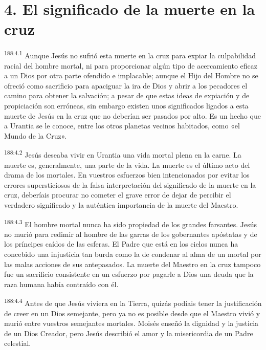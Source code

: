 \section*{4. El significado de la muerte en la cruz}
\par
\textsuperscript{188:4.1} Aunque Jesús no sufrió esta muerte en la cruz para expiar la culpabilidad racial del hombre mortal, ni para proporcionar algún tipo de acercamiento eficaz a un Dios por otra parte ofendido e implacable; aunque el Hijo del Hombre no se ofreció como sacrificio para apaciguar la ira de Dios y abrir a los pecadores el camino para obtener la salvación; a pesar de que estas ideas de expiación y de propiciación son erróneas, sin embargo existen unos significados ligados a esta muerte de Jesús en la cruz que no deberían ser pasados por alto. Es un hecho que a Urantia se le conoce, entre los otros planetas vecinos habitados, como «el Mundo de la Cruz».

\par
\textsuperscript{188:4.2} Jesús deseaba vivir en Urantia una vida mortal plena en la carne. La muerte es, generalmente, una parte de la vida. La muerte es el último acto del drama de los mortales. En vuestros esfuerzos bien intencionados por evitar los errores supersticiosos de la falsa interpretación del significado de la muerte en la cruz, deberíais procurar no cometer el grave error de dejar de percibir el verdadero significado y la auténtica importancia de la muerte del Maestro.

\par
\textsuperscript{188:4.3} El hombre mortal nunca ha sido propiedad de los grandes farsantes. Jesús no murió para redimir al hombre de las garras de los gobernantes apóstatas y de los príncipes caídos de las esferas. El Padre que está en los cielos nunca ha concebido una injusticia tan burda como la de condenar al alma de un mortal por las malas acciones de sus antepasados. La muerte del Maestro en la cruz tampoco fue un sacrificio consistente en un esfuerzo por pagarle a Dios una deuda que la raza humana había contraído con él.

\par
\textsuperscript{188:4.4} Antes de que Jesús viviera en la Tierra, quizás podíais tener la justificación de creer en un Dios semejante, pero ya no es posible desde que el Maestro vivió y murió entre vuestros semejantes mortales. Moisés enseñó la dignidad y la justicia de un Dios Creador, pero Jesús describió el amor y la misericordia de un Padre celestial.

